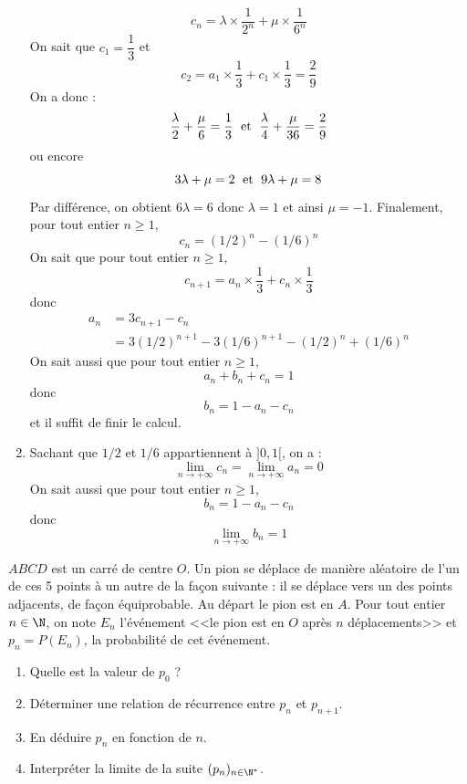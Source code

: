 \documentclass[a4paper,twoside,french,10pt]{VcCours}
\begin{document}
\begin{enumerate}
$$ c_n = \lambda \times \dfrac{1}{2^n} + \mu \times \dfrac{1}{6^n}$$
On sait que $c_1= \dfrac{1}{3}$ et 
$$ c_2 = a_1 \times \dfrac{1}{3} + c_1 \times \dfrac{1}{3} = \dfrac{2}{9}$$
On a donc :
$$ \dfrac{\lambda}{2} + \dfrac{\mu}{6} = \dfrac{1}{3} \; \hbox{ et } \; \dfrac{\lambda}{4} + \dfrac{\mu}{36} = \dfrac{2}{9}$$
ou encore 
$$ 3 \lambda + \mu = 2 \; \hbox{ et } \; 9 \lambda + \mu = 8$$
Par différence, on obtient $6 \lambda = 6$ donc $\lambda=1$ et ainsi $\mu=-1$. Finalement, pour tout entier $n \geq 1$,
$$c_n = (1/2)^n-(1/6)^n$$
On sait que pour tout entier $n \geq 1$,
$$c_{n+1} = a_n \times \dfrac{1}{3} + c_n \times \dfrac{1}{3}$$
donc 
\begin{align*}
 a_n & = 3c_{n+1}-c_n  \\
 & = 3 (1/2)^{n+1}-3(1/6)^{n+1} - (1/2)^n+(1/6)^n
 \end{align*}
On sait aussi que pour tout entier $n \geq 1$,
$$ a_n + b_n + c_n  = 1$$
donc 
$$ b_n = 1-a_n -c_n$$
et il suffit de finir le calcul.
\item Sachant que $1/2$ et $1/6$ appartiennent à $]0,1[$, on a :
$$ \lim_{n \rightarrow + \infty} c_n =  \lim_{n \rightarrow + \infty} a_n = 0$$
On sait aussi que pour tout entier $n \geq 1$,
$$  b_n = 1-a_n -c_n$$
donc 
$$\lim_{n \rightarrow + \infty} b_n = 1$$
\end{enumerate}


\begin{Exercice}{} $ABCD$ est un carré de centre $O$. Un pion se déplace de manière aléatoire de l'un de ces 5 points à un autre de la façon suivante : il se déplace vers un des points adjacents, de façon équiprobable. Au départ le pion est en $A$. Pour tout entier $n \in \N$, on note $E_n$ l'événement <<le pion est en $O$ après $n$ déplacements>> et $p_n = P(E_n)$, la probabilité de cet événement.
\begin{center}\end{center}
\begin{enumerate}
 \item Quelle est la valeur de $p_0$ ?
 \item Déterminer une relation de récurrence entre $p_n$ et $p_{n+1}$.
 \item En déduire $p_n$ en fonction de $n$.
 \item Interpréter la limite de la suite $(p_n)_{n\in \N^*}$.
\end{enumerate}
\end{Exercice}
\end{document}
